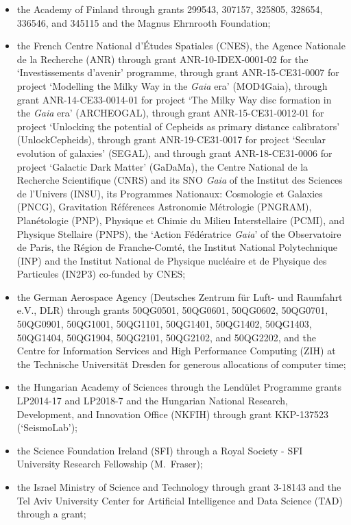 \documentclass{aa}
\newcommand{\gaia}{\textit{Gaia}\xspace}
\begin{document}
\begin{appendix}
\begin{itemize}
\item the Academy of Finland through grants 299543, 307157, 325805, 328654, 336546, and 345115 and the Magnus Ehrnrooth Foundation;
\item the French Centre National d’\'{E}tudes Spatiales (CNES), the Agence Nationale de la Recherche (ANR) through grant ANR-10-IDEX-0001-02 for the `Investissements d'avenir' programme, through grant ANR-15-CE31-0007 for project `Modelling the Milky Way in the \gaia era’ (MOD4Gaia), through grant ANR-14-CE33-0014-01 for project `The Milky Way disc formation in the \gaia era’ (ARCHEOGAL), through grant ANR-15-CE31-0012-01 for project `Unlocking the potential of Cepheids as primary distance calibrators’ (UnlockCepheids), through grant ANR-19-CE31-0017 for project `Secular evolution of galaxies' (SEGAL), and through grant ANR-18-CE31-0006 for project `Galactic Dark Matter' (GaDaMa), the Centre National de la Recherche Scientifique (CNRS) and its SNO \gaia of the Institut des Sciences de l’Univers (INSU), its Programmes Nationaux: Cosmologie et Galaxies (PNCG), Gravitation R\'{e}f\'{e}rences Astronomie M\'{e}trologie (PNGRAM), Plan\'{e}tologie (PNP), Physique et Chimie du Milieu Interstellaire (PCMI), and Physique Stellaire (PNPS), the `Action F\'{e}d\'{e}ratrice \gaia' of the Observatoire de Paris, the R\'{e}gion de Franche-Comt\'{e}, the Institut National Polytechnique (INP) and the Institut National de Physique nucl\'{e}aire et de Physique des Particules (IN2P3) co-funded by CNES;
\item the German Aerospace Agency (Deutsches Zentrum f\"{u}r Luft- und Raumfahrt e.V., DLR) through grants 50QG0501, 50QG0601, 50QG0602, 50QG0701, 50QG0901, 50QG1001, 50QG1101, 50\-QG1401, 50QG1402, 50QG1403, 50QG1404, 50QG1904, 50QG2101, 50QG2102, and 50QG2202, and the Centre for Information Services and High Performance Computing (ZIH) at the Technische Universit\"{a}t Dresden for generous allocations of computer time;
\item the Hungarian Academy of Sciences through the Lend\"{u}let Programme grants LP2014-17 and LP2018-7 and the Hungarian National Research, Development, and Innovation Office (NKFIH) through grant KKP-137523 (`SeismoLab');
\item the Science Foundation Ireland (SFI) through a Royal Society - SFI University Research Fellowship (M.~Fraser);
\item the Israel Ministry of Science and Technology through grant 3-18143 and the Tel Aviv University Center for Artificial Intelligence and Data Science (TAD) through a grant;

\end{itemize}
\end{appendix}
\end{document}
